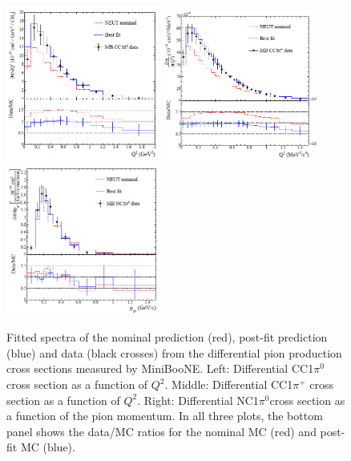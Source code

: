 \begin{figure}
\centering
\includegraphics[width=2in]{Figures/1pifit1.PNG}
\includegraphics[width=2in]{Figures/1pifit2.PNG}
\includegraphics[width=2in]{Figures/1pifit3.PNG}
\caption{Fitted spectra of the nominal prediction (red), post-fit prediction (blue) and data (black crosses) from the differential pion production cross sections measured by MiniBooNE. Left: Differential CC1$\pi^0$ cross section as a function of $Q^2$. Middle: Differential CC1$\pi^+$ cross section as a function of $Q^2$. Right: Differential NC1$\pi^0$cross section as a function of the pion momentum. In all three plots, the bottom panel shows the data/MC ratios for the nominal MC (red) and post-fit MC (blue).} 
\label{fig:1pifit}
\end{figure}

